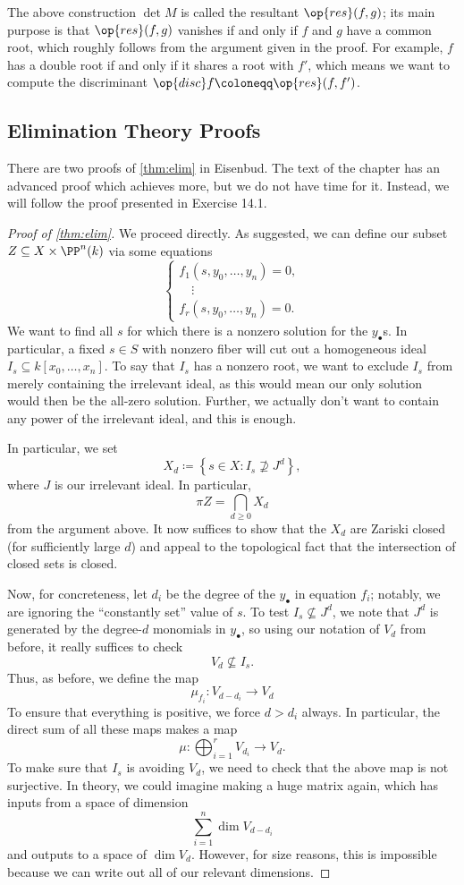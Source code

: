 \begin{remark}
	The above construction $\det M$ is called the resultant $\op{res}(f,g)$; its main purpose is that $\op{res}(f,g)$ vanishes if and only if $f$ and $g$ have a common root, which roughly follows from the argument given in the proof. For example, $f$ has a double root if and only if it shares a root with $f'$, which means we want to compute the discriminant $\op{disc}f\coloneqq\op{res}(f,f')$.
\end{remark}

\subsection{Elimination Theory Proofs}
There are two proofs of \autoref{thm:elim} in Eisenbud. The text of the chapter has an advanced proof which achieves more, but we do not have time for it. Instead, we will follow the proof presented in Exercise 14.1.
\begin{proof}[Proof of \autoref{thm:elim}]
	We proceed directly. As suggested, we can define our subset $Z\subseteq X\times\PP^n(k)$ via some equations
	\[\begin{cases}
		f_1(s,y_0,\ldots,y_n)=0, \\
		\quad\vdots \\
		f_r(s,y_0,\ldots,y_n)=0.
	\end{cases}\]
	We want to find all $s$ for which there is a nonzero solution for the $y_\bullet$s. In particular, a fixed $s\in S$ with nonzero fiber will cut out a homogeneous ideal $I_s\subseteq k[x_0,\ldots,x_n]$. To say that $I_s$ has a nonzero root, we want to exclude $I_s$ from merely containing the irrelevant ideal, as this would mean our only solution would then be the all-zero solution. Further, we actually don't want to contain any power of the irrelevant ideal, and this is enough.

	In particular, we set
	\[X_d\coloneqq\left\{s\in X:I_s\not\supseteq J^d\right\},\]
	where $J$ is our irrelevant ideal. In particular,
	\[\pi Z=\bigcap_{d\ge0}X_d\]
	from the argument above. It now suffices to show that the $X_d$ are Zariski closed (for sufficiently large $d$) and appeal to the topological fact that the intersection of closed sets is closed.

	Now, for concreteness, let $d_i$ be the degree of the $y_\bullet$ in equation $f_i$; notably, we are ignoring the ``constantly set'' value of $s$. To test $I_s\not\subseteq J^d$, we note that $J^d$ is generated by the degree-$d$ monomials in $y_\bullet$, so using our notation of $V_d$ from before, it really suffices to check
	\[V_d\not\subseteq I_s.\]
	Thus, as before, we define the map
	\[\mu_{f_i}\colon V_{d-d_i}\to V_d\]
	To ensure that everything is positive, we force $d>d_i$ always. In particular, the direct sum of all these maps makes a map
	\[\mu\colon\bigoplus_{i=1}^rV_{d_i}\to V_d.\]
	To make sure that $I_s$ is avoiding $V_d$, we need to check that the above map is not surjective. In theory, we could imagine making a huge matrix again, which has inputs from a space of dimension
	\[\sum_{i=1}^n\dim V_{d-d_i}\]
	and outputs to a space of $\dim V_d$. However, for size reasons, this is impossible because we can write out all of our relevant dimensions.
\end{proof}
